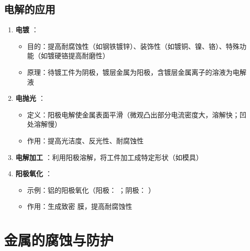\subsection{电解的应用} 
\begin{enumerate} 
    \item \textbf{电镀} ：
    \begin{itemize} 
        \item 目的：提高耐腐蚀性（如钢铁镀锌）、装饰性（如镀铜、镍、铬）、特殊功能（如镀硬铬提高耐磨性）
        \item 原理：待镀工件为阴极，镀层金属为阳极，含镀层金属离子的溶液为电解液
    \end{itemize} 
    
    \item \textbf{电抛光} ：
    \begin{itemize} 
        \item 定义：阳极电解使金属表面平滑（微观凸出部分电流密度大，溶解快；凹处溶解慢）
        \item 作用：提高光洁度、反光性、耐腐蚀性
    \end{itemize} 
    
    \item \textbf{电解加工} ：利用阳极溶解，将工件加工成特定形状（如模具）
    
    \item \textbf{阳极氧化} ：
    \begin{itemize} 
        \item 示例：铝的阳极氧化（阳极：  ；阴极：  ）
        \item 作用：生成致密  膜，提高耐腐蚀性
    \end{itemize} 
\end{enumerate} 

\section{金属的腐蚀与防护} 

